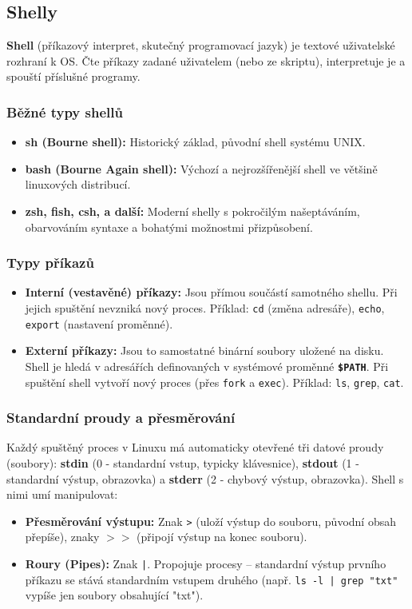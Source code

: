 \subsection{Shelly}

\textbf{Shell} (příkazový interpret, skutečný programovací jazyk) je textové uživatelské rozhraní k OS. Čte příkazy zadané uživatelem (nebo ze skriptu), interpretuje je a spouští příslušné programy.

\subsubsection*{Běžné typy shellů}
\begin{itemize}
    \item \textbf{sh (Bourne shell):} Historický základ, původní shell systému UNIX.
    \item \textbf{bash (Bourne Again shell):} Výchozí a nejrozšířenější shell ve většině linuxových distribucí.
    \item \textbf{zsh, fish, csh, a další:} Moderní shelly s pokročilým našeptáváním, obarvováním syntaxe a bohatými možnostmi přizpůsobení.
\end{itemize}

\subsubsection*{Typy příkazů}
\begin{itemize}
    \item \textbf{Interní (vestavěné) příkazy:} Jsou přímou součástí samotného shellu. Při jejich spuštění nevzniká nový proces. Příklad: \texttt{cd} (změna adresáře), \texttt{echo}, \texttt{export} (nastavení proměnné).
    \item \textbf{Externí příkazy:} Jsou to samostatné binární soubory uložené na disku. Shell je hledá v adresářích definovaných v systémové proměnné \textbf{\texttt{\$PATH}}. Při spuštění shell vytvoří nový proces (přes \texttt{fork} a \texttt{exec}). Příklad: \texttt{ls}, \texttt{grep}, \texttt{cat}.
\end{itemize}

\subsubsection*{Standardní proudy a přesměrování}
Každý spuštěný proces v Linuxu má automaticky otevřené tři datové proudy (soubory): \textbf{stdin} (0 - standardní vstup, typicky klávesnice), \textbf{stdout} (1 - standardní výstup, obrazovka) a \textbf{stderr} (2 - chybový výstup, obrazovka). Shell s nimi umí manipulovat:
\begin{itemize}
    \item \textbf{Přesměrování výstupu:} Znak \texttt{>} (uloží výstup do souboru, původní obsah přepíše), znaky \texttt{$>>$} (připojí výstup na konec souboru).
    \item \textbf{Roury (Pipes):} Znak \texttt{|}. Propojuje procesy – standardní výstup prvního příkazu se stává standardním vstupem druhého (např. \texttt{ls -l | grep "txt"} vypíše jen soubory obsahující "txt").
\end{itemize}

